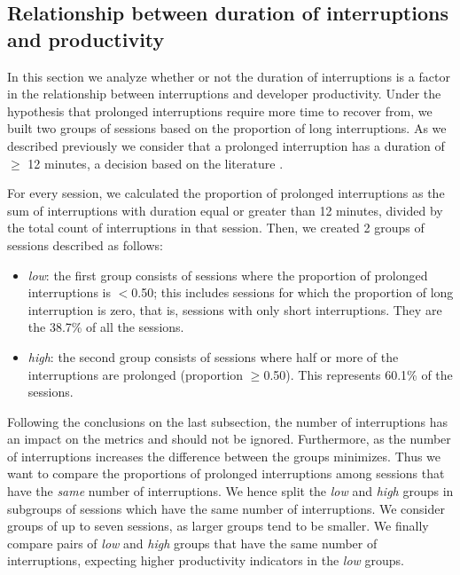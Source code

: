 \subsection{Relationship between duration of interruptions and productivity}

In this section we analyze whether or not the duration of interruptions is a factor in the relationship between interruptions and developer productivity. Under the hypothesis that prolonged interruptions require more time to recover from, we built two groups of sessions based on the proportion of long interruptions. As we described previously we consider that a prolonged interruption has a duration of $\geq$ 12 minutes, a decision based on the literature \cite{GM04, KaptelininN07}. %

For every session, we calculated the proportion of prolonged interruptions as the sum of interruptions with duration equal or greater than 12 minutes, divided by the total count of interruptions in that session. Then, we created 2 groups of sessions described as follows:

\begin{itemize}
	\item \textit{low}: the first group consists of sessions where the proportion of prolonged interruptions is $<$0.50; this includes sessions for which the proportion of long interruption is zero, that is, sessions with only short interruptions. They are the 38.7\% of all the sessions.
	\item \textit{high}: the second group consists of sessions where half or more of the interruptions are prolonged (proportion $\geq$0.50). This represents 60.1\% of the sessions.
\end{itemize} 

Following the conclusions on the last subsection, the number of interruptions has an impact on the metrics and should not be ignored. Furthermore, as the number of interruptions increases the difference between the groups minimizes.  %
Thus we want to compare the proportions of prolonged interruptions among sessions that have the \emph{same} number of interruptions. We hence split the \emph{low} and \emph{high} groups in subgroups of sessions which have the same number of interruptions. We consider groups of up to seven sessions, as larger groups tend to be smaller. We finally compare pairs of \emph{low} and \emph{high} groups that have the same number of interruptions, expecting higher productivity indicators in the \emph{low} groups.

